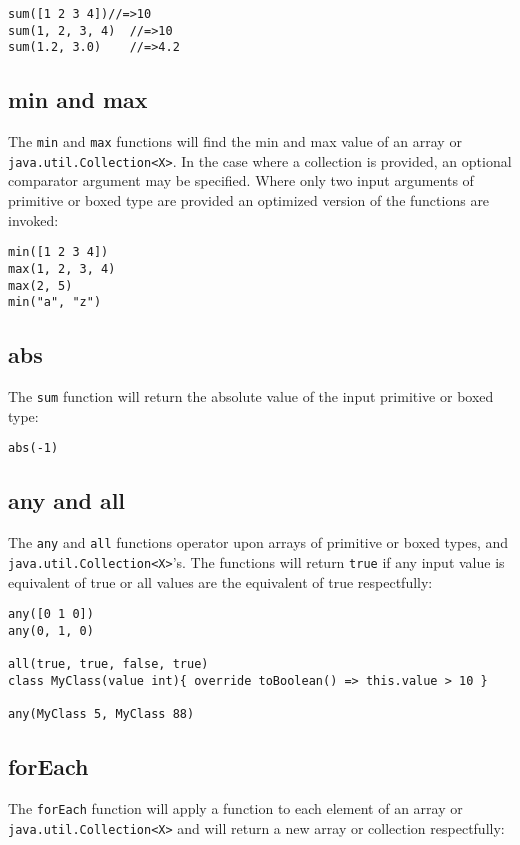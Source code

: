 \documentclass[conc-doc]{subfiles}
\begin{document}
\begin{lstlisting}
sum([1 2 3 4])//=>10
sum(1, 2, 3, 4)  //=>10
sum(1.2, 3.0)    //=>4.2
\end{lstlisting}

\subsection{min and max}
The \lstinline{min} and \lstinline{max} functions will find the min and max value of an array or \lstinline{java.util.Collection<X>}. In the case where a collection is provided, an optional comparator argument may be specified. Where only two input arguments of primitive or boxed type are provided an optimized version of the functions are invoked:

\begin{lstlisting}
min([1 2 3 4])
max(1, 2, 3, 4)  
max(2, 5)
min("a", "z")
\end{lstlisting}

\subsection{abs}
The \lstinline{sum} function will return the absolute value of the input primitive or boxed type:

\begin{lstlisting}
abs(-1)
\end{lstlisting}

\subsection{any and all}
The \lstinline{any} and \lstinline{all} functions operator upon arrays of primitive or boxed types, and \lstinline{java.util.Collection<X>}'s. The functions will return \lstinline{true} if any input value is equivalent of true or all values are the equivalent of true respectfully:

\begin{lstlisting}
any([0 1 0])
any(0, 1, 0)

all(true, true, false, true)
class MyClass(value int){ override toBoolean() => this.value > 10 }

any(MyClass 5, MyClass 88)
\end{lstlisting}

\subsection{forEach}
The \lstinline{forEach} function will apply a function to each element of an array or \lstinline{java.util.Collection<X>} and will return a new array or collection respectfully:
\end{document}
